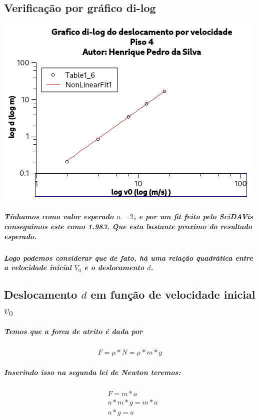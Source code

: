 \documentclass[12pt,twoside, a4paper, twocolumn]{article}
\begin{document}
\subsection{Verificação por gráfico di-log}
\begin{adjustbox}{scale=0.70}
    \includegraphics{Grafico-5.jpg}
\end{adjustbox}

\subparagraph*{Tínhamos como valor esperado $n = 2$, e por um \emph{fit} feito pelo SciDAVis conseguimos este como 1.983. Que esta bastante proximo do resultado esperado.}
\subparagraph*{Logo podemos considerar que de fato, há uma relação quadrática entre a velocidade inicial $V_0$ e o deslocamento $d$.}

\subsection{Deslocamento $d$ em função de velocidade inicial $v_0$}

\subparagraph*{Temos que a forca de atrito é dada por}

\begin{equation}
    \begin{aligned}
        F = \mu * N = \mu * m * g
    \end{aligned}
\end{equation}

\subparagraph*{Inserindo isso na segunda lei de Newton teremos:}

\begin{equation}
    \begin{aligned}
         & F      = m*a \\
         & u*m*g  = m*a \\
         & u*g    = a
    \end{aligned}
\end{equation}
\end{document}
